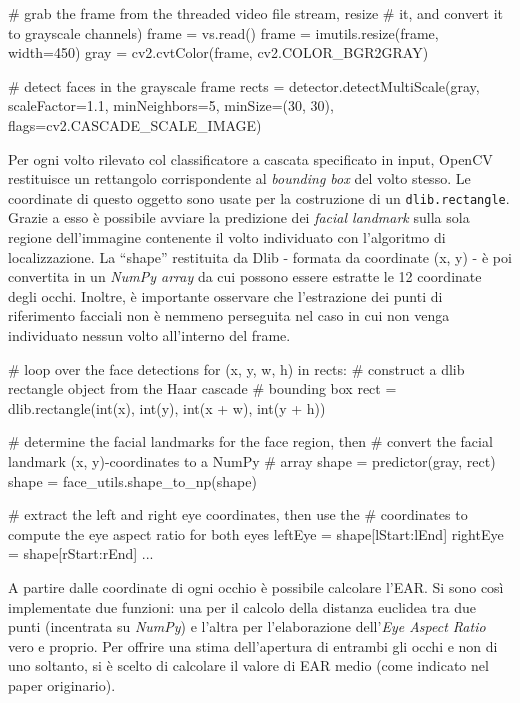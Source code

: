 \documentclass[12pt]{article}
\newcommand{\quotes}[1]{``#1''}
\begin{document}
\begin{python}
	# grab the frame from the threaded video file stream, resize
	# it, and convert it to grayscale channels)
	frame = vs.read()
	frame = imutils.resize(frame, width=450)
	gray = cv2.cvtColor(frame, cv2.COLOR_BGR2GRAY)
	
	# detect faces in the grayscale frame
	rects = detector.detectMultiScale(gray, scaleFactor=1.1, 
		minNeighbors=5, minSize=(30, 30),
		flags=cv2.CASCADE_SCALE_IMAGE)
\end{python}

\vspace{0.3cm}
Per ogni volto rilevato col classificatore a cascata specificato in input, OpenCV restituisce un rettangolo corrispondente al \textit{bounding box} del volto stesso. Le coordinate di questo oggetto sono usate per la costruzione di un \texttt{dlib.rectangle}. Grazie a esso è possibile avviare la predizione dei \textit{facial landmark} sulla sola regione dell'immagine contenente il volto individuato con l'algoritmo di localizzazione. La \quotes{shape} restituita da Dlib - formata da coordinate (x, y) - è poi convertita in un \textit{NumPy array} da cui possono essere estratte le 12 coordinate degli occhi. Inoltre, è importante osservare che l'estrazione dei punti di riferimento facciali non è nemmeno perseguita nel caso in cui non venga individuato nessun volto all'interno del frame.
\vspace{0.3cm}

\begin{python}
	# loop over the face detections
	for (x, y, w, h) in rects:
		# construct a dlib rectangle object from the Haar cascade
		# bounding box
		rect = dlib.rectangle(int(x), int(y), int(x + w),
		int(y + h))
		
		# determine the facial landmarks for the face region, then
		# convert the facial landmark (x, y)-coordinates to a NumPy
		# array
		shape = predictor(gray, rect)
		shape = face_utils.shape_to_np(shape)
		
		# extract the left and right eye coordinates, then use the
		# coordinates to compute the eye aspect ratio for both eyes
		leftEye = shape[lStart:lEnd]
		rightEye = shape[rStart:rEnd]
		...
\end{python}

\vspace{0.3cm}
A partire dalle coordinate di ogni occhio è possibile calcolare l'EAR. Si sono così implementate due funzioni: una per il calcolo della distanza euclidea tra due punti (incentrata su \textit{NumPy}) e l'altra per l'elaborazione dell'\textit{Eye Aspect Ratio} vero e proprio. Per offrire una stima dell'apertura di entrambi gli occhi e non di uno soltanto, si è scelto di calcolare il valore di EAR medio (come indicato nel paper originario\cite{EAR}).
\vspace{0.3cm}
\end{document}
